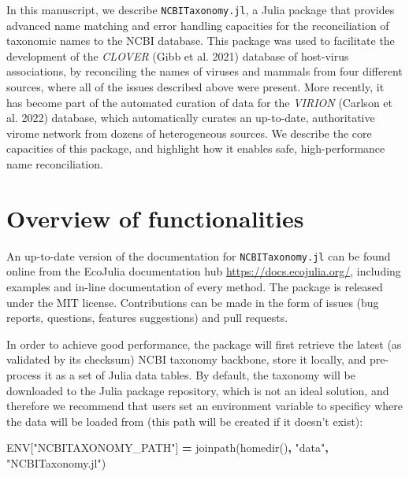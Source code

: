 \documentclass[10pt,oneside]{article}
\newenvironment{Shaded}{\begin{snugshade}}{\end{snugshade}}
\newcommand{\ConstantTok}[1]{\textcolor[rgb]{0.00,0.00,0.00}{#1}}
\newcommand{\StringTok}[1]{\textcolor[rgb]{0.31,0.60,0.02}{#1}}
\newcommand{\OperatorTok}[1]{\textcolor[rgb]{0.81,0.36,0.00}{\textbf{#1}}}
\newcommand{\NormalTok}[1]{#1}
\begin{document}
In this manuscript, we describe \texttt{NCBITaxonomy.jl}, a Julia
package that provides advanced name matching and error handling
capacities for the reconciliation of taxonomic names to the NCBI
database. This package was used to facilitate the development of the
\emph{CLOVER} (Gibb et al. 2021) database of host-virus associations, by
reconciling the names of viruses and mammals from four different
sources, where all of the issues described above were present. More
recently, it has become part of the automated curation of data for the
\emph{VIRION} (Carlson et al. 2022) database, which automatically
curates an up-to-date, authoritative virome network from dozens of
heterogeneous sources. We describe the core capacities of this package,
and highlight how it enables safe, high-performance name reconciliation.

\hypertarget{overview-of-functionalities}{%
\section{Overview of
functionalities}\label{overview-of-functionalities}}

An up-to-date version of the documentation for \texttt{NCBITaxonomy.jl}
can be found online from the EcoJulia documentation hub
\href{https://docs.ecojulia.org/NCBITaxonomy.jl/stable/}{https://docs.ecojulia.org/},
including examples and in-line documentation of every method. The
package is released under the MIT license. Contributions can be made in
the form of issues (bug reports, questions, features suggestions) and
pull requests.

In order to achieve good performance, the package will first retrieve
the latest (as validated by its checksum) NCBI taxonomy backbone, store
it locally, and pre-process it as a set of Julia data tables. By
default, the taxonomy will be downloaded to the Julia package
repository, which is not an ideal solution, and therefore we recommend
that users set an environment variable to specificy where the data will
be loaded from (this path will be created if it doesn't exist):

\begin{Shaded}
\begin{Highlighting}[]
\ConstantTok{ENV}\NormalTok{[}\StringTok{"NCBITAXONOMY\_PATH"}\NormalTok{] }\OperatorTok{=}\NormalTok{ joinpath(homedir()}\OperatorTok{,} \StringTok{"data"}\OperatorTok{,} \StringTok{"NCBITaxonomy.jl"}\NormalTok{)}
\end{Highlighting}
\end{Shaded}
\end{document}
